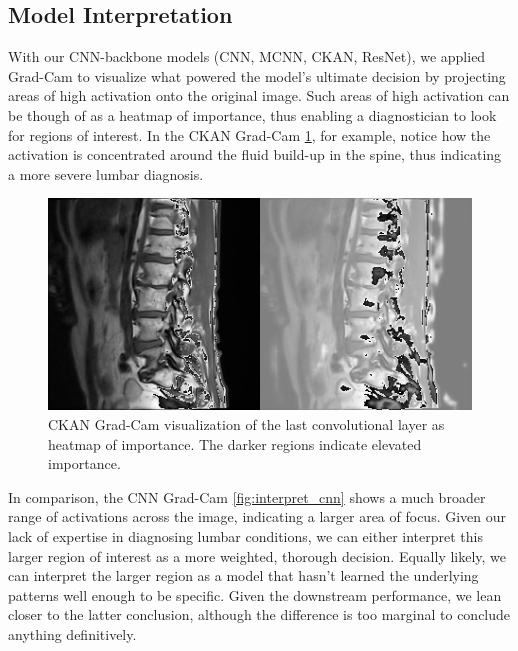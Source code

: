 \documentclass[conference]{IEEEtran}
\begin{document}



\subsection{Model Interpretation}
With our CNN-backbone models (CNN, MCNN, CKAN, ResNet), we applied Grad-Cam to visualize what powered the model's ultimate decision by projecting areas of high activation onto the original image. Such areas of high activation can be though of as a heatmap of importance, thus enabling a diagnostician to look for regions of interest. In the CKAN Grad-Cam \ref{fig:interpret_ckan}, for example, notice how the activation is concentrated around the fluid build-up in the spine, thus indicating a more severe lumbar diagnosis.

\begin{figure}
    \centering
    \includegraphics[width=1.0\linewidth]{visuals/CKAN_interpretation.png}
    \caption{CKAN Grad-Cam visualization of the last convolutional layer as heatmap of importance. The darker regions indicate elevated importance.
    }
    \label{fig:interpret_ckan}
\end{figure}

In comparison, the CNN Grad-Cam \ref{fig:interpret_cnn} shows a much broader range of activations across the image, indicating a larger area of focus. Given our lack of expertise in diagnosing lumbar conditions, we can either interpret this larger region of interest as a more weighted, thorough decision. Equally likely, we can interpret the larger region as a model that hasn't learned the underlying patterns well enough to be specific. Given the downstream performance, we lean closer to the latter conclusion, although the difference is too marginal to conclude anything definitively.
\end{document}
